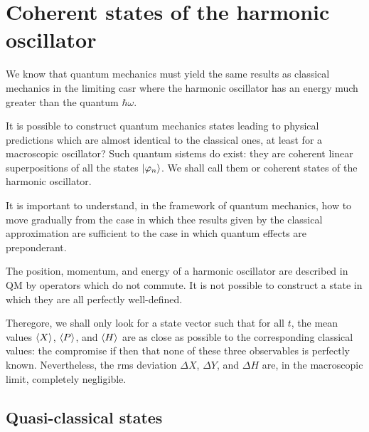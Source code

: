 \section{Coherent states of the harmonic oscillator}
We know that quantum mechanics must yield the same results as classical mechanics in the limiting casr where the harmonic 
oscillator has an energy much greater than the quantum $\hbar\omega$.

It is possible to construct quantum mechanics states leading to physical predictions which are almost identical to the classical ones, at least 
for a macroscopic oscillator? Such quantum sistems do exist: they are coherent linear superpositions of all the states $|\varphi_n\rangle$. We shall 
call them  or coherent states of the harmonic oscillator.

It is important to understand, in the framework of quantum mechanics, how to move gradually from the case in which thee results given by the classical approximation 
are sufficient to the case in which quantum effects are preponderant.

The position, momentum, and energy of a harmonic oscillator are described in QM by operators which do not commute.
It is not possible to construct a state in which they are all perfectly well-defined.

Theregore, we shall only look for a state vector such that for all $t$, the mean values $\langle X\rangle$, $\langle P\rangle$, and $\langle H\rangle$ are 
as close as possible to the corresponding classical values: the compromise if then that none of these three observables is perfectly known.
Nevertheless, the rms deviation $\Delta X$, $\Delta Y$, and $\Delta H$ are, in the macroscopic limit, completely negligible.
\subsection{Quasi-classical states}
%
